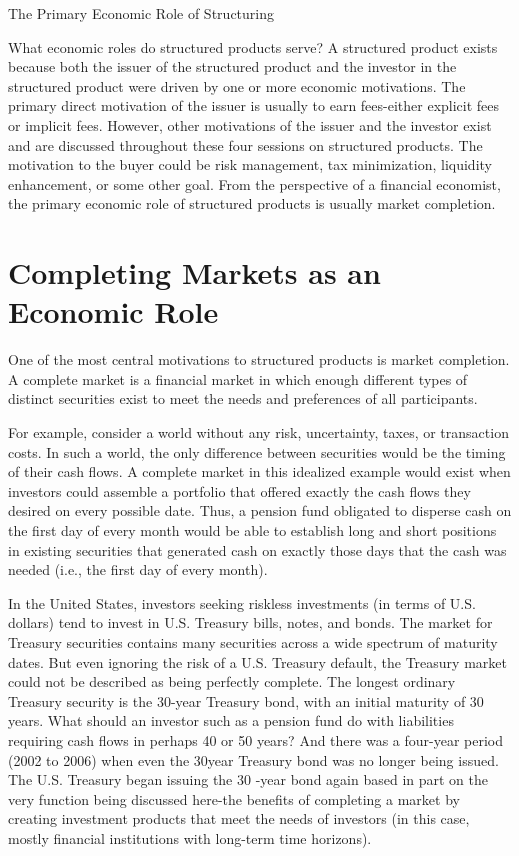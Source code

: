 \documentclass[11pt]{article}
\begin{document}
The Primary Economic Role of Structuring

What economic roles do structured products serve? A structured product exists because both the issuer of the structured product and the investor in the structured product were driven by one or more economic motivations. The primary direct motivation of the issuer is usually to earn fees-either explicit fees or implicit fees. However, other motivations of the issuer and the investor exist and are discussed throughout these four sessions on structured products. The motivation to the buyer could be risk management, tax minimization, liquidity enhancement, or some other goal. From the perspective of a financial economist, the primary economic role of structured products is usually market completion.

\section*{Completing Markets as an Economic Role}
One of the most central motivations to structured products is market completion. A complete market is a financial market in which enough different types of distinct securities exist to meet the needs and preferences of all participants.

For example, consider a world without any risk, uncertainty, taxes, or transaction costs. In such a world, the only difference between securities would be the timing of their cash flows. A complete market in this idealized example would exist when investors could assemble a portfolio that offered exactly the cash flows they desired on every possible date. Thus, a pension fund obligated to disperse cash on the first day of every month would be able to establish long and short positions in existing securities that generated cash on exactly those days that the cash was needed (i.e., the first day of every month).

In the United States, investors seeking riskless investments (in terms of U.S. dollars) tend to invest in U.S. Treasury bills, notes, and bonds. The market for Treasury securities contains many securities across a wide spectrum of maturity dates. But even ignoring the risk of a U.S. Treasury default, the Treasury market could not be described as being perfectly complete. The longest ordinary Treasury security is the 30-year Treasury bond, with an initial maturity of 30 years. What should an investor such as a pension fund do with liabilities requiring cash flows in perhaps 40 or 50 years? And there was a four-year period (2002 to 2006) when even the 30year Treasury bond was no longer being issued. The U.S. Treasury began issuing the 30 -year bond again based in part on the very function being discussed here-the benefits of completing a market by creating investment products that meet the needs of investors (in this case, mostly financial institutions with long-term time horizons).
\end{document}
